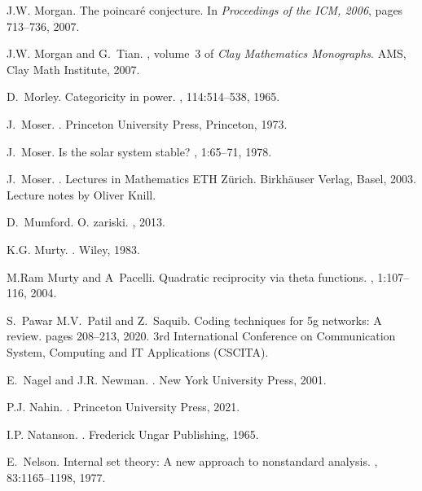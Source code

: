 \documentclass[12pt]{amsart}
\begin{document}
\begin{thebibliography}{100}
J.W. Morgan.
\newblock The poincar\'e conjecture.
\newblock In {\em Proceedings of the ICM, 2006}, pages 713--736, 2007.

J.W. Morgan and G.~Tian.
, volume~3 of {\em Clay
  Mathematics Monographs}.
\newblock AMS, Clay Math Institute, 2007.

D.~Morley.
\newblock Categoricity in power.
, 114:514--538, 1965.

J.~Moser.
.
\newblock Princeton {University} Press, Princeton, 1973.

J.~Moser.
\newblock Is the solar system stable?
, 1:65--71, 1978.

J.~Moser.
.
\newblock Lectures in Mathematics ETH Z\"urich. Birkh{\"a}user Verlag, Basel,
  2003.
\newblock Lecture notes by Oliver Knill.

D.~Mumford.
\newblock O. zariski.
, 2013.

K.G. Murty.
.
\newblock Wiley, 1983.

M.Ram Murty and A~Pacelli.
\newblock Quadratic reciprocity via theta functions.
, 1:107--116, 2004.

S.~Pawar M.V.~Patil and Z.~Saquib.
\newblock Coding techniques for 5g networks: A review.
\newblock pages 208--213, 2020.
 3rd International Conference on Communication System, Computing
  and IT Applications (CSCITA).

E.~Nagel and J.R. Newman.
.
\newblock New York University Press, 2001.

P.J. Nahin.
.
\newblock Princeton University Press, 2021.

I.P. Natanson.
.
\newblock Frederick Ungar Publishing, 1965.

E.~Nelson.
\newblock Internal set theory: A new approach to nonstandard analysis.
, 83:1165--1198, 1977.


\end{thebibliography}
\end{document}
